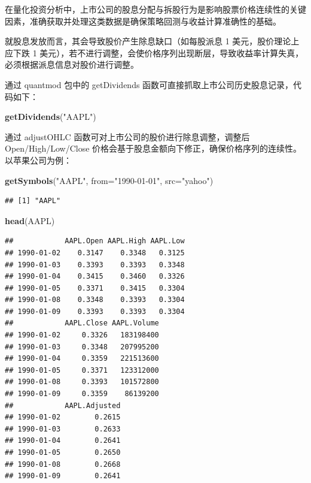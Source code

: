 \documentclass[]{ctexbook}
\newenvironment{Shaded}{\begin{snugshade}}{\end{snugshade}}
\newcommand{\AttributeTok}[1]{\textcolor[rgb]{0.13,0.29,0.53}{#1}}
\newcommand{\FunctionTok}[1]{\textcolor[rgb]{0.13,0.29,0.53}{\textbf{#1}}}
\newcommand{\NormalTok}[1]{#1}
\newcommand{\StringTok}[1]{\textcolor[rgb]{0.31,0.60,0.02}{#1}}
\begin{document}
在量化投资分析中，上市公司的股息分配与拆股行为是影响股票价格连续性的关键因素，准确获取并处理这类数据是确保策略回测与收益计算准确性的基础。

就股息发放而言，其会导致股价产生除息缺口（如每股派息 1 美元，股价理论上应下跌 1
美元），若不进行调整，会使价格序列出现断层，导致收益率计算失真，必须根据派息信息对股价进行调整。

通过 quantmod 包中的 getDividends 函数可直接抓取上市公司历史股息记录，代码如下：

\begin{Shaded}
\begin{Highlighting}[]
\FunctionTok{getDividends}\NormalTok{(}\StringTok{"AAPL"}\NormalTok{)}
\end{Highlighting}
\end{Shaded}

通过 adjustOHLC 函数可对上市公司的股价进行除息调整，调整后 Open/High/Low/Close 价格会基于股息金额向下修正，确保价格序列的连续性。以苹果公司为例：

\begin{Shaded}
\begin{Highlighting}[]
\FunctionTok{getSymbols}\NormalTok{(}\StringTok{"AAPL"}\NormalTok{, }\AttributeTok{from=}\StringTok{"1990{-}01{-}01"}\NormalTok{, }\AttributeTok{src=}\StringTok{"yahoo"}\NormalTok{)}
\end{Highlighting}
\end{Shaded}

\begin{verbatim}
## [1] "AAPL"
\end{verbatim}

\begin{Shaded}
\begin{Highlighting}[]
\FunctionTok{head}\NormalTok{(AAPL)}
\end{Highlighting}
\end{Shaded}

\begin{verbatim}
##            AAPL.Open AAPL.High AAPL.Low
## 1990-01-02    0.3147    0.3348   0.3125
## 1990-01-03    0.3393    0.3393   0.3348
## 1990-01-04    0.3415    0.3460   0.3326
## 1990-01-05    0.3371    0.3415   0.3304
## 1990-01-08    0.3348    0.3393   0.3304
## 1990-01-09    0.3393    0.3393   0.3304
##            AAPL.Close AAPL.Volume
## 1990-01-02     0.3326   183198400
## 1990-01-03     0.3348   207995200
## 1990-01-04     0.3359   221513600
## 1990-01-05     0.3371   123312000
## 1990-01-08     0.3393   101572800
## 1990-01-09     0.3359    86139200
##            AAPL.Adjusted
## 1990-01-02        0.2615
## 1990-01-03        0.2633
## 1990-01-04        0.2641
## 1990-01-05        0.2650
## 1990-01-08        0.2668
## 1990-01-09        0.2641
\end{verbatim}
\end{document}
